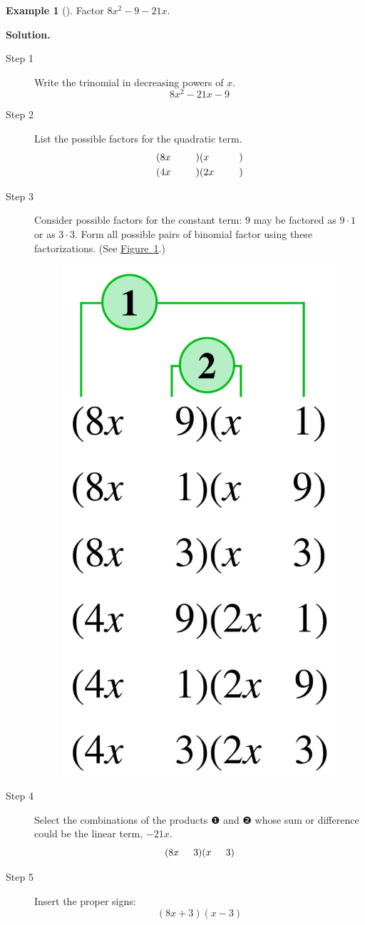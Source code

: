 \documentclass[10pt,]{book}
\theoremstyle{plain}
\theoremstyle{definition}
\theoremstyle{definition}
\newtheorem{example}[theorem]{Example}
\theoremstyle{definition}
\numberwithin{equation}{part}
\newcommand{\amp}{&}
\begin{document}
\begin{example}[]\label{example-51}
Factor \(8x^2 − 9 − 21x\).%
\par\medskip\noindent%
\textbf{Solution.}\quad \leavevmode%
\begin{description}
\item[{Step 1}]\hypertarget{li-238}{}Write the trinomial in decreasing powers of \(x\).%
\begin{equation*}
8x^2-21x-9
\end{equation*}
%
\item[{Step 2}]\hypertarget{li-239}{}List the possible factors for the quadratic term.%
\begin{align*}
(8x\hphantom{00000})\amp(x\hphantom{000000})\\
(4x\hphantom{00000})\amp(2x\hphantom{00000})
\end{align*}
%
\item[{Step 3}]\hypertarget{li-240}{}Consider possible factors for the constant term: \(9\) may be factored as \(9\cdot 1\) or as \(3\cdot 3\). Form all possible pairs of binomial factor using these factorizations. (See \hyperref[fig-factor-trinomial]{Figure~\ref{fig-factor-trinomial}}.) \leavevmode%
\begin{figure}
\centering
\includegraphics[width=0.4\linewidth]{images/fig-factor-trinomial.jpg}
\caption{\label{fig-factor-trinomial}}
\end{figure}
%
\item[{Step 4}]\hypertarget{li-241}{}Select the combinations of the products ❶ and ❷ whose sum or difference could be the linear term, \(-21x\).%
\begin{equation*}
(8x \hphantom{000} 3) (x \hphantom{000} 3)
\end{equation*}
%
\item[{Step 5}]\hypertarget{li-242}{}Insert the proper signs:%
\begin{equation*}
(8x + 3) (x − 3)
\end{equation*}
%
\end{description}
%
\end{example}
\end{document}
